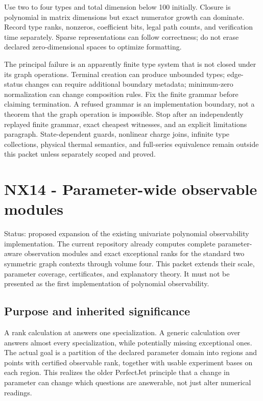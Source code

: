 \documentclass[
  11pt,
  a4paper,
]{report}
\let\nxtexttt\texttt
\renewcommand{\texttt}[1]{\nxtexttt{\seqsplit{#1}}}
\begin{document}
Use two to four types and total dimension below 100 initially. Closure
is polynomial in matrix dimensions but exact numerator growth can
dominate. Record type ranks, nonzeros, coefficient bits, legal path
counts, and verification time separately. Sparse representations can
follow correctness; do not erase declared zero-dimensional spaces to
optimize formatting.

The principal failure is an apparently finite type system that is not
closed under its graph operations. Terminal creation can produce
unbounded types; edge-status changes can require additional boundary
metadata; minimum-zero normalization can change composition rules. Fix
the finite grammar before claiming termination. A refused grammar is an
implementation boundary, not a theorem that the graph operation is
impossible. Stop after an independently replayed finite grammar, exact
cheapest witnesses, and an explicit limitations paragraph.
State-dependent guards, nonlinear charge joins, infinite type
collections, physical thermal semantics, and full-series equivalence
remain outside this packet unless separately scoped and proved.

\hypertarget{nx14---parameter-wide-observable-modules}{%
\chapter{NX14 - Parameter-wide observable
modules}\label{nx14---parameter-wide-observable-modules}}

Status: proposed expansion of the existing univariate polynomial
observability implementation. The current repository already computes
complete parameter-aware observation modules and exact exceptional ranks
for the standard two symmetric graph contexts through volume four. This
packet extends their scale, parameter coverage, certificates, and
explanatory theory. It must not be presented as the first implementation
of polynomial observability.

\hypertarget{purpose-and-inherited-significance}{%
\section{Purpose and inherited
significance}\label{purpose-and-inherited-significance}}

A rank calculation at \texttt{q=1/2} answers one specialization. A
generic calculation over \texttt{Q(q)} answers almost every
specialization, while potentially missing exceptional ones. The actual
goal is a partition of the declared parameter domain into regions and
points with certified observable rank, together with usable experiment
bases on each region. This realizes the older PerfectJet principle that
a change in parameter can change which questions are answerable, not
just alter numerical readings.
\end{document}
